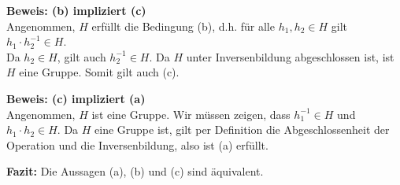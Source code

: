 \documentclass[11pt]{article}
\begin{document}
\textbf{Beweis: (b) impliziert (c)} \\
Angenommen, \( H \) erfüllt die Bedingung (b), d.h. für alle \( h_1, h_2 \in H \) gilt \( h_1 \cdot h_2^{-1} \in H \). \\
Da \( h_2 \in H \), gilt auch \( h_2^{-1} \in H \). Da \( H \) unter Inversenbildung abgeschlossen ist, ist \( H \) eine Gruppe. Somit gilt auch (c).

\textbf{Beweis: (c) impliziert (a)} \\
Angenommen, \( H \) ist eine Gruppe. Wir müssen zeigen, dass \( h_1^{-1} \in H \) und \( h_1 \cdot h_2 \in H \). Da \( H \) eine Gruppe ist, gilt per Definition die Abgeschlossenheit der Operation und die Inversenbildung, also ist (a) erfüllt.

\textbf{Fazit:} Die Aussagen (a), (b) und (c) sind äquivalent.



\end{document}
